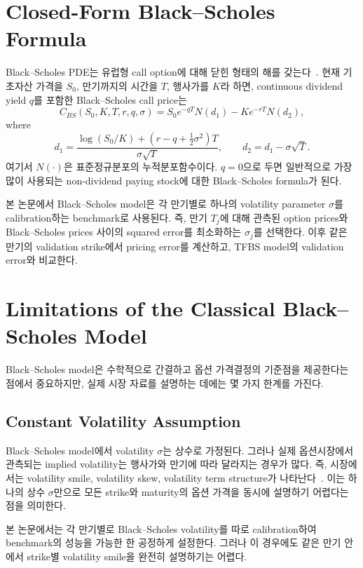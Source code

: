 \documentclass[11pt,a4paper]{report}
\begin{document}
\section{Closed-Form Black--Scholes Formula}

Black--Scholes PDE는 유럽형 call option에 대해 닫힌 형태의 해를 갖는다~\cite{BlackScholes1973,Merton1973}. 현재 기초자산 가격을 $S_0$, 만기까지의 시간을 $T$, 행사가를 $K$라 하면, continuous dividend yield $q$를 포함한 Black--Scholes call price는
\[
C_{BS}(S_0,K,T,r,q,\sigma)
=
S_0 e^{-qT}N(d_1)
-
K e^{-rT}N(d_2),
\]
where
\[
d_1
=
\frac{
\log(S_0/K)
+
(r-q+\frac{1}{2}\sigma^2)T
}{
\sigma\sqrt{T}
},
\qquad
d_2=d_1-\sigma\sqrt{T}.
\]
여기서 $N(\cdot)$은 표준정규분포의 누적분포함수이다. $q=0$으로 두면 일반적으로 가장 많이 사용되는 non-dividend paying stock에 대한 Black--Scholes formula가 된다.

본 논문에서 Black--Scholes model은 각 만기별로 하나의 volatility parameter $\sigma$를 calibration하는 benchmark로 사용된다. 즉, 만기 $T_j$에 대해 관측된 option prices와 Black--Scholes prices 사이의 squared error를 최소화하는 $\sigma_j$를 선택한다. 이후 같은 만기의 validation strike에서 pricing error를 계산하고, TFBS model의 validation error와 비교한다.

\section{Limitations of the Classical Black--Scholes Model}

Black--Scholes model은 수학적으로 간결하고 옵션 가격결정의 기준점을 제공한다는 점에서 중요하지만, 실제 시장 자료를 설명하는 데에는 몇 가지 한계를 가진다.

\subsection{Constant Volatility Assumption}

Black--Scholes model에서 volatility $\sigma$는 상수로 가정된다. 그러나 실제 옵션시장에서 관측되는 implied volatility는 행사가와 만기에 따라 달라지는 경우가 많다. 즉, 시장에서는 volatility smile, volatility skew, volatility term structure가 나타난다~\cite{Dupire1994,Heston1993}. 이는 하나의 상수 $\sigma$만으로 모든 strike와 maturity의 옵션 가격을 동시에 설명하기 어렵다는 점을 의미한다.

본 논문에서는 각 만기별로 Black--Scholes volatility를 따로 calibration하여 benchmark의 성능을 가능한 한 공정하게 설정한다. 그러나 이 경우에도 같은 만기 안에서 strike별 volatility smile을 완전히 설명하기는 어렵다.
\end{document}
